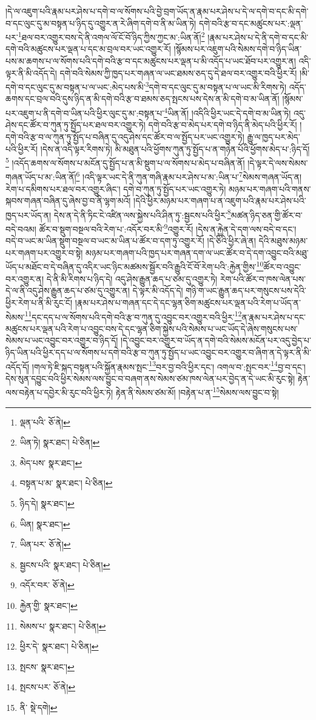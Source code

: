 །དེ་ལ་འཇུག་པའི་རྣམ་པར་ཤེས་པ་དགེ་བ་ལ་སོགས་པའི་བྱེ་བྲག་ཡོད་ན་རྣམ་པར་ཤེས་པ་དེ་ལ་དགེ་བ་དང་མི་དགེ་བ་དང་ལུང་དུ་མ་བསྟན་པ་ཉིད་དུ་འགྱུར་ན་རེ་ཞིག་དགེ་བ་ནི་མ་ཡིན་ཏེ། དགེ་བའི་རྩ་བ་དང་མཚུངས་པར་:ལྡན་པར་\footnote{ལྡན་པའི་  ཅོ་ནེ། }ཐལ་བར་འགྱུར་བས་དེ་ནི་འགལ་ལོ་ངོ་བོ་ཉིད་ཀྱིས་ཀྱང་མ་:ཡིན་ནོ།\footnote{ཡིན་ཏེ།  སྣར་ཐང་།  པེ་ཅིན། } །རྣམ་པར་ཤེས་པ་དེ་ནི་དགེ་བ་དང་མི་དགེ་བའི་མཚུངས་པར་ལྡན་པ་དང་མ་བྲལ་བར་ཡང་འགྱུར་རོ། །སྙོམས་པར་འཇུག་པའི་སེམས་དགེ་བ་ཉིད་ཡིན་པས་མ་ཆགས་པ་ལ་སོགས་པའི་དགེ་བའི་རྩ་བ་དང་མཚུངས་པར་ལྡན་པ་མི་འདོད་པ་ཡང་ཐོབ་པར་འགྱུར་ན། འདི་ལྟར་ནི་མི་འདོད་དེ། དགེ་བའི་སེམས་ཀྱི་ཁྱད་པར་གཞན་ལ་ཡང་ཐམས་ཅད་དུ་དེ་ཐལ་བར་འགྱུར་བའི་ཕྱིར་རོ། །མི་དགེ་བ་དང་ལུང་དུ་མ་བསྟན་པ་ལ་ཡང་:མེད་པས་མི་\footnote{མེད་པས་  སྣར་ཐང་། }དགེ་བ་དང་ལུང་དུ་མ་བསྟན་པ་ལ་ཡང་མི་རིགས་ཏེ། འདོད་ཆགས་དང་བྲལ་བའི་དུས་ཉིད་ན་མི་དགེ་བའི་རྩ་བ་ཐམས་ཅད་སྤངས་པས་དེས་ན་མི་དགེ་བ་མ་ཡིན་ནོ། །སྙོམས་པར་འཇུག་པ་ནི་དགེ་བ་ཡིན་པའི་ཕྱིར་ལུང་དུ་མ་:བསྟན་པ་\footnote{བསྟན་པ་མ་  སྣར་ཐང་།  པེ་ཅིན། }ཡིན་ནོ། །འདིའི་ཕྱིར་ཡང་དེ་དགེ་བ་མ་ཡིན་ཏེ། འདུ་ཤེས་དང་ཚོར་བ་ཀུན་ཏུ་སྤྱོད་པར་ཐལ་བར་འགྱུར་ཏེ། དགེ་བའི་རྩ་བ་མེད་པར་དགེ་བ་ཉིད་ནི་མེད་པའི་ཕྱིར་རོ། །དགེ་བའི་རྩ་བ་ལ་ཀུན་ཏུ་སྤྱོད་པ་བཞིན་དུ་འདུ་ཤེས་དང་ཚོར་བ་ལ་སྤྱོད་པར་ཡང་འགྱུར་ཏེ། རྒྱུ་ལ་ཁྱད་པར་མེད་པའི་ཕྱིར་རོ། །དེས་ན་འདི་ལྟར་རིགས་ཏེ། མི་མཐུན་པའི་ཕྱོགས་ཀུན་ཏུ་སྤྱོད་པ་ན་གཉེན་པོའི་ཕྱོགས་མེད་པ་:ཉིད་དོ།\footnote{ཉིད་དེ།  སྣར་ཐང་། } །འདོད་ཆགས་ལ་སོགས་པ་མངོན་དུ་སྤྱོད་པ་ན་མི་སྡུག་པ་ལ་སོགས་པ་མེད་པ་བཞིན་ནོ། །དེ་ལྟར་དེ་ལས་སེམས་གཞན་ཡོད་པ་མ་:ཡིན་ནོ།\footnote{ཡིན།  སྣར་ཐང་། } །འདི་ལྟར་ཡང་དེ་ནི་ཀུན་གཞི་རྣམ་པར་ཤེས་པ་མ་:ཡིན་པ་\footnote{ཡིན་པར་  ཅོ་ནེ། }སེམས་གཞན་ཡོད་ན། རེག་པ་དམིགས་པར་ཐལ་བར་འགྱུར་ཞིང་། དགེ་བ་ཀུན་ཏུ་སྤྱོད་པར་ཡང་འགྱུར་ཏེ། མཉམ་པར་གཞག་པའི་གནས་སྐབས་གཞན་བཞིན་དུ་ཞེས་བྱ་བ་ནི་ལྷག་མའོ། །དེའི་ཕྱིར་མཉམ་པར་གཞག་པ་ན་འཇུག་པའི་རྣམ་པར་ཤེས་པའི་ཁྱད་པར་ཡོད་ན། དེས་ན་དེ་ནི་ཏིང་ངེ་འཛིན་ལས་སྐྱེས་པའི་ཤིན་ཏུ་:སྦྱངས་པའི་ཕྱིར་\footnote{སྦྱངས་པའི་  སྣར་ཐང་།  པེ་ཅིན། }མཚན་ཉིད་ཅན་གྱི་ཚོར་བ་བདེ་བའམ། ཚོར་བ་སྡུག་བསྔལ་བའི་རེག་པ་:འདོར་བར་མི་\footnote{འདོར་བར་  ཅོ་ནེ། }འགྱུར་རོ། །དེས་ན་རྐྱེན་དེ་དག་ལས་བདེ་བ་དང་། བདེ་བ་ཡང་མ་ཡིན་སྡུག་བསྔལ་བ་ཡང་མ་ཡིན་པ་ཚོར་བ་དག་ཏུ་འགྱུར་རོ། །དེ་ཅིའི་ཕྱིར་ཞེ་ན། དེའི་མཐུས་མཉམ་པར་གཞག་པར་འགྱུར་བ་སྟེ། མཉམ་པར་གཞག་པའི་ཁྱད་པར་གཞན་དག་ལ་ཡང་ཚོར་བ་དེ་དག་འབྱུང་བའི་མཐུ་ཡོད་པ་མཐོང་བ་དེ་བཞིན་དུ་འདིར་ཡང་ཉིང་མཚམས་སྦྱོར་བའི་རྒྱུའི་ངོ་བོ་རེག་པའི་:རྐྱེན་གྱིས་\footnote{རྐྱེན་གྱི་  སྣར་ཐང་། }ཚོར་བ་འབྱུང་བར་འགྱུར་ན། དེ་ནི་མི་རིགས་པ་ཉིད་དེ། འདུ་ཤེས་རྒྱུན་ཆད་པ་ཙམ་དུ་འགྱུར་ཏེ། རེག་པའི་ཚོར་བ་ཁས་ལེན་པས་དེ་ལ་ནི་འདུ་ཤེས་རྒྱུན་ཆད་པ་ཙམ་དུ་འགྱུར་ན། དེ་ལྟར་མི་འདོད་དེ། གཉི་ག་ཡང་རྒྱུན་ཆད་པར་གསུངས་པས་དེའི་ཕྱིར་རེག་པ་ནི་མི་རུང་ངོ། །རྣམ་པར་ཤེས་པ་གཞན་དང་དེ་དང་ལྷན་ཅིག་མཚུངས་པར་ལྡན་པའི་རེག་པ་ཡོད་ན་སེམས་\footnote{སེམས་པ་  སྣར་ཐང་།  པེ་ཅིན། }དང་དད་པ་ལ་སོགས་པའི་དགེ་བའི་རྩ་བ་ཀུན་དུ་འབྱུང་བར་འགྱུར་བའི་ཕྱིར་\footnote{ཕྱིར་དེ་  སྣར་ཐང་།  པེ་ཅིན། }ན་རྣམ་པར་ཤེས་པ་དང་མཚུངས་པར་ལྡན་པའི་རེག་པ་འབྱུང་བས་དེ་དང་ལྷན་ཅིག་སྐྱེས་པའི་སེམས་པ་ཡང་ཡོད་དེ་ཞེས་གསུངས་པས་སེམས་པ་ཡང་འབྱུང་བར་འགྱུར་བ་ཉིད་དོ། །དེ་འབྱུང་བར་འགྱུར་བ་ཡོད་ན་དགེ་བའི་སེམས་མངོན་པར་འདུ་བྱེད་པ་ཉིད་ཡིན་པའི་ཕྱིར་དད་པ་ལ་སོགས་པ་དགེ་བའི་རྩ་བ་ཀུན་ཏུ་སྤྱོད་པ་ཡང་འབྱུང་བར་འགྱུར་བ་ཞིག་ན་དེ་ལྟར་ནི་མི་འདོད་དོ། །གལ་ཏེ་ཇི་སྐད་བསྟན་པའི་སྐྱོན་རྣམས་སྤང་\footnote{སྤངས་  སྣར་ཐང་། }བར་བྱ་བའི་ཕྱིར་དང་། འགལ་བ་:སྤང་བར་\footnote{སྤངས་པར་  ཅོ་ནེ། }བྱ་བ་དང་། དེས་སུན་དབྱུང་བའི་ཕྱིར་སེམས་ལས་བྱུང་བ་བཞག་ནས་སེམས་ཙམ་ཁས་ལེན་པར་བྱེད་ན་དེ་ཡང་མི་རུང་སྟེ། རྟེན་ལས་བརྟེན་པ་དབྱེར་མི་རུང་བའི་ཕྱིར་ཏེ། རྟེན་ནི་སེམས་ཙམ་མོ། །བརྟེན་པ་ན་\footnote{ནི་  སྡེ་དགེ། }སེམས་ལས་བྱུང་བ་སྟེ། 